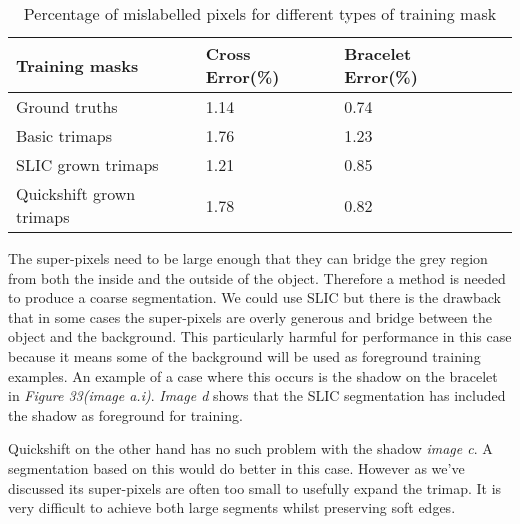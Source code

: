 \documentclass[12pt]{IIBproject}
\begin{document}
  
\begin{table}
\begin{center}
    \begin{tabular}{ | l | l | l | p{5cm} |}
    \hline
    Training masks & Cross Error(\%) & Bracelet Error(\%) \\ \hline
    Ground truths & 1.14 & 0.74 \\ \hline
    Basic trimaps & 1.76 & 1.23 \\
    \hline
    SLIC grown trimaps & 1.21 & 0.85 \\
    \hline
    Quickshift grown trimaps & 1.78 & 0.82 \\
    \hline
    \end{tabular}
    \caption{Percentage of mislabelled pixels for different types of training mask}\label{table:somename}
\end{center}
\end{table}
The super-pixels need to be large enough that they can bridge the grey region from both the inside and the outside of the object. Therefore a method is needed to produce a coarse segmentation. We could use SLIC but there is the drawback that in some cases the super-pixels are overly generous and bridge between the object and the background. This particularly harmful for performance in this case because it means some of the background will be used as foreground training examples. An example of a case where this occurs is the shadow on the bracelet in \emph{Figure 33(image a.i)}. \emph{Image d} shows that the SLIC segmentation has included the shadow as foreground for training.

Quickshift on the other hand has no such problem with the shadow \emph{image c}. A segmentation based on this would do better in this case. However as we've discussed its super-pixels are often too small to usefully expand the trimap. It is very difficult to achieve both large segments whilst preserving soft edges. 
\end{document}
